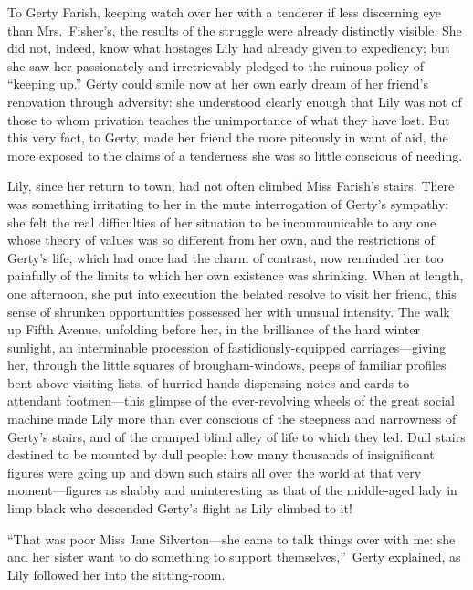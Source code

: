 \documentclass[12pt,a4paper]{book}
\begin{document}
To Gerty Farish, keeping watch over her with a tenderer if less
discerning eye than Mrs.\ Fisher's, the results of the struggle
were already distinctly visible. She did not, indeed, know what
hostages Lily had already given to expediency; but she saw her
passionately and irretrievably pledged to the ruinous policy of
``keeping up.'' Gerty could smile now at her own early dream of her
friend's renovation through adversity: she understood clearly
enough that Lily was not of those to whom privation teaches the
unimportance of what they have lost. But this very fact, to
Gerty, made her friend the more piteously in want of aid, the
more exposed to the claims of a tenderness she was so little
conscious of needing.





Lily, since her return to town, had not often climbed Miss
Farish's stairs. There was something irritating to her in the
mute interrogation of Gerty's sympathy: she felt the real
difficulties of her situation to be incommunicable to any one
whose theory of values was so different from her own, and the
restrictions of Gerty's life, which had once had the charm of
contrast, now reminded her too painfully of the limits to which
her own existence was shrinking. When at length, one afternoon,
she put into execution the belated resolve to visit her friend,
this sense of shrunken opportunities possessed her with unusual
intensity. The walk up Fifth Avenue, unfolding before her, in the
brilliance of the hard winter sunlight, an interminable
procession of fastidiously-equipped carriages---giving her,
through the little squares of brougham-windows, peeps of familiar
profiles bent above visiting-lists, of hurried hands dispensing
notes and cards to attendant footmen---this glimpse of the
ever-revolving wheels of the great social machine made Lily more
than ever conscious of the steepness and narrowness of Gerty's
stairs, and of the cramped blind alley of life to which they led. 
Dull stairs destined to be mounted by dull people: how many
thousands of insignificant figures were going up and down such
stairs all over the world at that very moment---figures as shabby
and uninteresting as that of the middle-aged lady in limp
black who descended Gerty's flight as Lily climbed to it!





``That was poor Miss Jane Silverton---she came to talk things over
with me: she and her sister want to do something to support
themselves,''\ Gerty explained, as Lily followed her into the
sitting-room.
\end{document}
